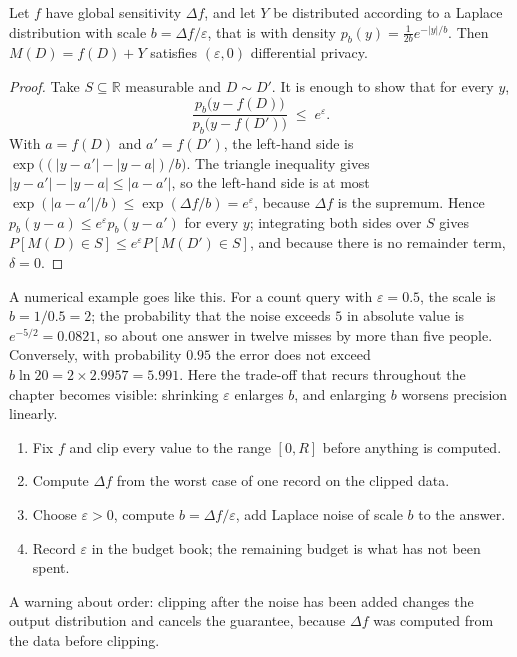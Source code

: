 \begin{teorema}
Let $f$ have global sensitivity $\Delta f$, and let $Y$ be distributed according to a
Laplace distribution with scale $b=\Delta f/\varepsilon$, that is with density
$p_b(y)=\frac{1}{2b}e^{-|y|/b}$. Then $M(D)=f(D)+Y$ satisfies $(\varepsilon,0)$
differential privacy.
\end{teorema}

\begin{proof}
Take $S\subseteq\mathbb{R}$ measurable and $D\sim D'$. It is enough to show that for
every $y$,
\begin{equation}
\frac{p_b\bigl(y-f(D)\bigr)}{p_b\bigl(y-f(D')\bigr)} \;\le\; e^{\varepsilon}.
\end{equation}
With $a=f(D)$ and $a'=f(D')$, the left-hand side is $\exp\bigl((|y-a'|-|y-a|)/b\bigr)$.
The triangle inequality gives $|y-a'|-|y-a|\le|a-a'|$, so the left-hand side is at most
$\exp(|a-a'|/b)\le\exp(\Delta f/b)=e^{\varepsilon}$, because $\Delta f$ is the supremum.
Hence $p_b(y-a)\le e^{\varepsilon}p_b(y-a')$ for every $y$; integrating both sides over
$S$ gives $P[M(D)\in S]\le e^{\varepsilon}P[M(D')\in S]$, and because there is no
remainder term, $\delta=0$.
\end{proof}

A numerical example goes like this. For a count query with $\varepsilon=0.5$, the scale
is $b=1/0.5=2$; the probability that the noise exceeds $5$ in absolute value is
$e^{-5/2}=0.0821$, so about one answer in twelve misses by more than five people.
Conversely, with probability $0.95$ the error does not exceed
$b\ln 20=2\times 2.9957=5.991$. Here the trade-off that recurs throughout the chapter
becomes visible: shrinking $\varepsilon$ enlarges $b$, and enlarging $b$ worsens
precision linearly.

\begin{resep}
\begin{enumerate}
  \item Fix $f$ and clip every value to the range $[0,R]$ before anything is computed.
  \item Compute $\Delta f$ from the worst case of one record on the clipped data.
  \item Choose $\varepsilon>0$, compute $b=\Delta f/\varepsilon$, add Laplace noise of
        scale $b$ to the answer.
  \item Record $\varepsilon$ in the budget book; the remaining budget is what has not
        been spent.
\end{enumerate}
A warning about order: clipping after the noise has been added changes the output
distribution and cancels the guarantee, because $\Delta f$ was computed from the data
before clipping.
\end{resep}


